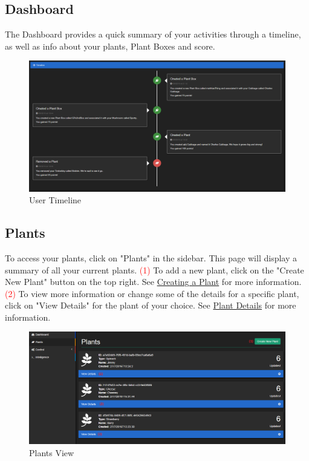 \documentclass{article}
\begin{document}
	\subsection{Dashboard}
	The Dashboard provides a quick summary of your activities through a timeline, as well as info about your plants, Plant Boxes and score.
	\begin{figure}[H]
		\includegraphics[width=\textwidth]{../images/UserManual/timeline.png}
		\caption{User Timeline}
	\end{figure}

	\subsection{Plants}
	To access your plants, click on "Plants" in the sidebar. This page will display a summary of all your current plants.
	\newline
	\textcolor{red}{(1)} To add a new plant, click on the "Create New Plant" button on the top right. See \hyperref[sec:creating-a-plant]{Creating a Plant} for more information.
	\newline
	\textcolor{red}{(2)} To view more information or change some of the details for a specific plant, click on "View Details" for the plant of your choice. See \hyperref[sec:plant-details]{Plant Details} for more information.
	\begin{figure}[H]
		\includegraphics[width=\textwidth]{../images/UserManual/plants.PNG}
		\caption{Plants View}
	\end{figure}
		
\end{document}

